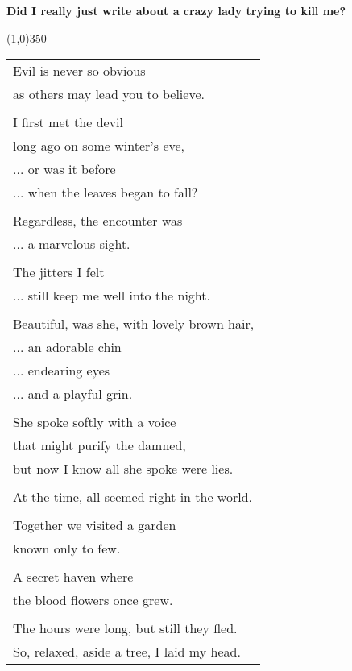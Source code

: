 \documentclass{article}
\begin{document}
\newcommand{\h}{\hspace{3ex}}
\newcommand{\hoar}{%
\begin{center}
\line(1,0){350}
\end{center}
}

\begin{center}
\textbf{Did I really just write about a crazy lady trying to kill me?}
\hoar
\begin{tabular}{l}
Evil is never so obvious \\
\h as others may lead you to believe. \\
\\
I first met the devil \\
\h long ago on some winter's eve, \\
\h ... or was it before \\
\h ... when the leaves began to fall? \\
\\
Regardless, the encounter was \\
\h ... a marvelous sight. \\
\\
The jitters I felt \\
\h ... still keep me well into the night. \\
\\
Beautiful, was she, with lovely brown hair, \\
\h ... an adorable chin \\
\h ... endearing eyes \\
\h ... and a playful grin. \\
\\
She spoke softly with a voice \\
\h that might purify the damned, \\
\h but now I know all she spoke were lies. \\
\\
At the time, all seemed right in the world. \\
\\
Together we visited a garden \\
\h known only to few. \\
\\
A secret haven where \\
\h the blood flowers once grew. \\
\\
The hours were long, but still they fled. \\
So, relaxed, aside a tree, I laid my head. \\

\end{tabular}
\end{center}
\end{document}
